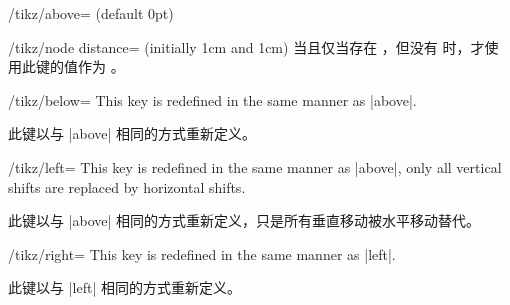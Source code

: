 \begin{key}{/tikz/above= (default 0pt)}
\begin{key}{/tikz/node distance= (initially 1cm and 1cm)}
        当且仅当存在 ，但没有  时，才使用此键的值作为 。


\begin{codeexample}[preamble={\usetikzlibrary{positioning}}]
\end{codeexample}
    \end{key}
\end{key}

\begin{key}{/tikz/below=}
    This key is redefined in the same manner as |above|.

    此键以与 |above| 相同的方式重新定义。


\end{key}

\begin{key}{/tikz/left=}
    This key is redefined in the same manner as |above|, only all vertical
    shifts are replaced by horizontal shifts.

    此键以与 |above| 相同的方式重新定义，只是所有垂直移动被水平移动替代。

\end{key}

\begin{key}{/tikz/right=}
    This key is redefined in the same manner as |left|.

    此键以与 |left| 相同的方式重新定义。

\end{key}

